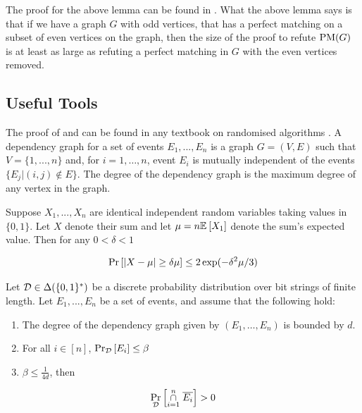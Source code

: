 \documentclass[11pt]{article}
\begin{document}
The proof for the above lemma can be found in \citep[Lemma 2.2]{Austrin_2022}.
What the above lemma says is that if we have a graph $G$ with odd vertices, that has a perfect matching on a subset of even vertices on the graph, then the size of the proof to refute $\text{PM}(G)$ is at least as large as refuting a perfect matching in $G$ with the even vertices removed.

\subsection{Useful Tools}

The proof of  and 
can be found in any textbook on randomised algorithms \citep[See Chapter 1, Chapter 7]{mitzenmacher2017probability}.
A dependency graph for a set of events $E_1, . . . , E_n$ is a graph $G=(V, E)$ such that $V = \{1,.. . , n\}$ and,  for $i= 1,\dots, n$, event $E_i$ is mutually independent
of the events $\{E_j | (i, j) \notin E\}$. The degree of the dependency graph is the maximum degree of any vertex in the graph.


\begin{lemma}\label{lemma:mult-chernoff}
Suppose $X_1, ..., X_n$ are identical independent random variables taking values in $\{0, 1\}$. Let $X$ denote their sum and let $\mu = n\mathbb{E}_{}\left[X_1\right]$ denote the sum's expected value. Then for any $0 < \delta < 1$

\[ \Pr\left[|X - \mu| \geq \delta \mu \right] \leq 2\exp(-\delta^2\mu/3)\]

\end{lemma}




\begin{lemma}\label{lemma:lll}Let $\mathcal{D} \in \Delta(\{0,1\}^*)$ be a discrete probability distribution over bit strings of finite length.
  Let $E_1,...,E_n$ be a set of events, and assume that the following hold:
\begin{enumerate}
\item The degree of the dependency graph given by $(E_1, \dots, E_n)$ is bounded by $d$.

\item For all $i \in [n]$, $\Pr_{\mathcal{D}}\left[E_i \right] \leq \beta$

\item $\beta \leq \frac{1}{4d}$, then

\end{enumerate}

\[ \Pr_{\mathcal{D}}\left[\overset{n}{ \underset{i=1}{\cap}} \hspace{0.1cm}  \overline{E_i} \right] > 0\]


\end{lemma}
\end{document}
